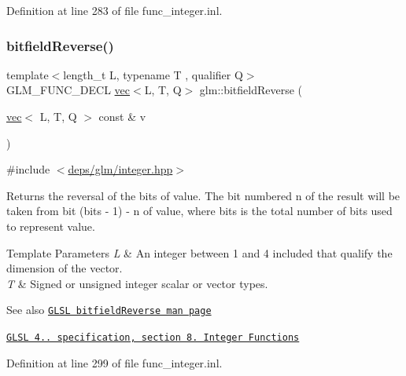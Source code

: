Definition at line 283 of file func\+\_\+integer.\+inl.

\mbox{\label{group__core__func__integer_ga750a1d92464489b7711dee67aa3441b6}} 
\subsubsection{\texorpdfstring{bitfield\+Reverse()}{bitfieldReverse()}}
{\footnotesize\ttfamily template$<$length\+\_\+t L, typename T , qualifier Q$>$ \\
G\+L\+M\+\_\+\+F\+U\+N\+C\+\_\+\+D\+E\+CL \hyperlink{structglm_1_1vec}{vec}$<$L, T, Q$>$ glm\+::bitfield\+Reverse (\begin{DoxyParamCaption}\item[{\hyperlink{structglm_1_1vec}{vec}$<$ L, T, Q $>$ const \&}]{v }\end{DoxyParamCaption})}



{\ttfamily \#include $<$\hyperlink{integer_8hpp}{deps/glm/integer.\+hpp}$>$}

Returns the reversal of the bits of value. The bit numbered n of the result will be taken from bit (bits -\/ 1) -\/ n of value, where bits is the total number of bits used to represent value.


\begin{DoxyTemplParams}{Template Parameters}
{\em L} & An integer between 1 and 4 included that qualify the dimension of the vector. \\
\hline
{\em T} & Signed or unsigned integer scalar or vector types.\\
\hline
\end{DoxyTemplParams}
\begin{DoxySeeAlso}{See also}
\href{http://www.opengl.org/sdk/docs/manglsl/xhtml/bitfieldReverse.xml}{\tt G\+L\+SL bitfield\+Reverse man page} 

\href{http://www.opengl.org/registry/doc/GLSLangSpec.4.20.8.pdf}{\tt G\+L\+SL 4.. specification, section 8. Integer Functions} 
\end{DoxySeeAlso}


Definition at line 299 of file func\+\_\+integer.\+inl.

\mbox{\label{group__core__func__integer_gaf74c4d969fa34ab8acb9d390f5ca5274}} 
